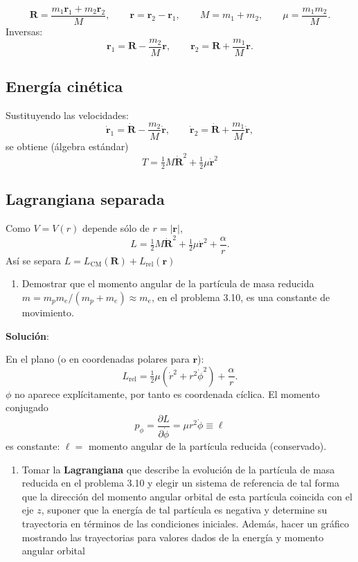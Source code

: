 \documentclass{article}
\newenvironment{AGbox}[1][7]%
{%
  \begin{tcolorbox}[
    enhanced, breakable,
    colframe=AppleGreen,
    colback=AppleGreen!#1,
    boxrule=1pt,
    borderline west={2mm}{-10mm}{AppleGreen},
    sharp corners=southwest,
    left=14pt,right=14pt,top=10pt,bottom=10pt,
     boxsep=6pt,
  ]%
}{%
  \end{tcolorbox}%
}
\begin{document}
\[
\boldsymbol R = \frac{m_1\boldsymbol r_1 + m_2\boldsymbol r_2}{M},\qquad
\boldsymbol r = \boldsymbol r_2 - \boldsymbol r_1,\qquad
M=m_1+m_2,\qquad \mu=\frac{m_1m_2}{M}.
\]
Inversas:
\[
\boldsymbol r_1 = \boldsymbol R - \frac{m_2}{M}\boldsymbol r,\qquad
\boldsymbol r_2 = \boldsymbol R + \frac{m_1}{M}\boldsymbol r.
\]

\subsection*{Energía cinética}
Sustituyendo las velocidades:
\[
\dot{\boldsymbol r}_1 = \dot{\boldsymbol R} - \frac{m_2}{M}\dot{\boldsymbol r},\qquad
\dot{\boldsymbol r}_2 = \dot{\boldsymbol R} + \frac{m_1}{M}\dot{\boldsymbol r},
\]
se obtiene (álgebra estándar)
\[
T=\tfrac12 M\dot{\boldsymbol R}^2 + \tfrac12 \mu\dot{\boldsymbol r}^2
\]

\subsection*{Lagrangiana separada}
Como \(V=V(r)\) depende sólo de \(r=|\boldsymbol r|\),
\[
\boxed{L = \tfrac12 M\dot{\boldsymbol R}^2 + \tfrac12 \mu\dot{\boldsymbol r}^2 + \frac{\alpha}{r}.}
\]
Así se separa \(L=L_{\text{CM}}(\boldsymbol R)+L_{\text{rel}}(\boldsymbol r)\)

\begin{AGbox}[8]
\begin{enumerate}[label={{\textcolor{trueblue}{\textbf{Pr.} \arabic*.11}}}, start=3]
  \item Demostrar que el momento angular de la partícula de masa reducida $m=m_{p}m_{e}/(m_{p}+m_{e})\approx m_{e}$, en el problema 3.10, es una constante de movimiento.
\end{enumerate}
\end{AGbox}

\textcolor{Cinnabar}{\textbf{Solución}}:

En el plano (o en coordenadas polares para \(\boldsymbol r\)):
\[
L_{\text{rel}} = \tfrac12\mu(\dot r^2 + r^2\dot\phi^2) + \frac{\alpha}{r}.
\]
\(\phi\) no aparece explícitamente, por tanto es coordenada cíclica. El momento conjugado
\[
p_\phi = \frac{\partial L}{\partial\dot\phi} = \mu r^2\dot\phi \equiv \ell
\]
es constante: \(\ell=\) momento angular de la partícula reducida (conservado).

\begin{AGbox}[8]
\begin{enumerate}[label={{\textcolor{trueblue}{\textbf{Pr.} \arabic*.12}}}, start=3]
  \item Tomar la \textbf{Lagrangiana} que describe la evolución de la partícula de masa reducida en el problema 3.10 y elegir un sistema de referencia de tal forma que la dirección del momento angular orbital de esta partícula coincida con el eje $z$, suponer que la energía de tal partícula es negativa y determine su trayectoria en términos de las condiciones iniciales. Además, hacer un gráfico mostrando las trayectorias para valores dados de la energía y momento angular orbital
\end{enumerate}
\end{AGbox}
\end{document}
